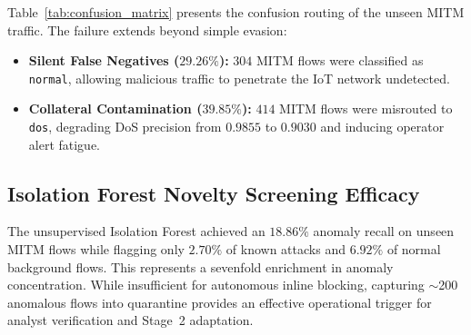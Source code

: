 \documentclass[conference]{IEEEtran}
\begin{document}
Table~\ref{tab:confusion_matrix} presents the confusion routing of the unseen MITM traffic. The failure extends beyond simple evasion:
\begin{itemize}
    \item \textbf{Silent False Negatives ($29.26\%$):} $304$ MITM flows were classified as \texttt{normal}, allowing malicious traffic to penetrate the IoT network undetected.
    \item \textbf{Collateral Contamination ($39.85\%$):} $414$ MITM flows were misrouted to \texttt{dos}, degrading DoS precision from $0.9855$ to $0.9030$ and inducing operator alert fatigue.
\end{itemize}

\begin{table}[htbp]
\centering
\caption{Misclassification routing of $1{,}039$ unseen MITM flows by the closed-world baseline Random Forest.}
\label{tab:confusion_matrix}
\end{table}

\subsection{Isolation Forest Novelty Screening Efficacy}
The unsupervised Isolation Forest achieved an $18.86\%$ anomaly recall on unseen MITM flows while flagging only $2.70\%$ of known attacks and $6.92\%$ of normal background flows. This represents a sevenfold enrichment in anomaly concentration. While insufficient for autonomous inline blocking, capturing $\sim$200 anomalous flows into quarantine provides an effective operational trigger for analyst verification and Stage~2 adaptation.
\end{document}

